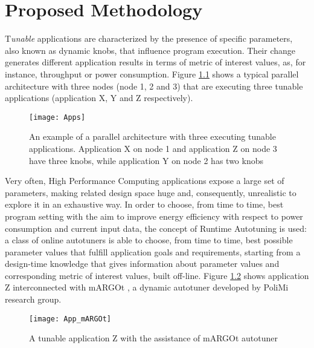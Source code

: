 \chapter{Proposed Methodology}\label{methodology}

\lettrine{T}{}\textit{unable} applications are characterized by the presence of specific parameters, also known as dynamic knobs, that influence program execution. Their change generates different application results in terms of metric of interest values, as, for instance, throughput or power consumption. Figure \ref{fig::appDef} shows a typical parallel architecture with three nodes (node 1, 2 and 3) that are executing three tunable applications (application X, Y and Z respectively).

\begin{figure}[htb]

    \centering
    \texttt{[image: Apps]}

    \caption[An example of a parallel architecture with tunable applications]{An example of a parallel architecture with three executing tunable applications. Application X on node 1 and application Z on node 3 have three knobs, while application Y on node 2 has two knobs}
    \label{fig::appDef}
    
\end{figure}

Very often, High Performance Computing applications expose a large set of parameters, making related design space huge and, consequently, unrealistic to explore it in an exhaustive way. In order to choose, from time to time, best program setting with the aim to improve energy efficiency with respect to power consumption and current input data, the concept of Runtime Autotuning is used: a class of online autotuners is able to choose, from time to time, best possible parameter values that fulfill application goals and requirements, starting from a design-time knowledge that gives information about parameter values and corresponding metric of interest values, built off-line. Figure \ref{fig::appAut} shows application Z interconnected with mARGOt \cite{gadioli2015application}, a dynamic autotuner developed by PoliMi research group.

\begin{figure}[htb]

    \centering
    \texttt{[image: App\_mARGOt]}
    \caption{A tunable application Z with the assistance of mARGOt autotuner}
    \label{fig::appAut}
    
\end{figure}

